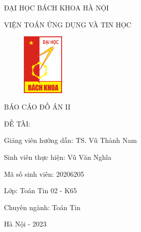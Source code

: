 ĐẠI HỌC BÁCH KHOA HÀ NỘI

VIỆN TOÁN ỨNG DỤNG VÀ TIN HỌC





\begin{figure}[h]
    \centering
    \includegraphics[height=3cm]{pictures/logoBK.png}
\end{figure}






BÁO CÁO ĐỒ ÁN II

ĐỀ TÀI:



Giảng viên hướng dẫn: TS. Vũ Thành Nam

Sinh viên thực hiện: Vũ Văn Nghĩa

Mã số sinh viên: 20206205

Lớp: Toán Tin 02 - K65

Chuyên ngành: Toán Tin

Hà Nội - 2023